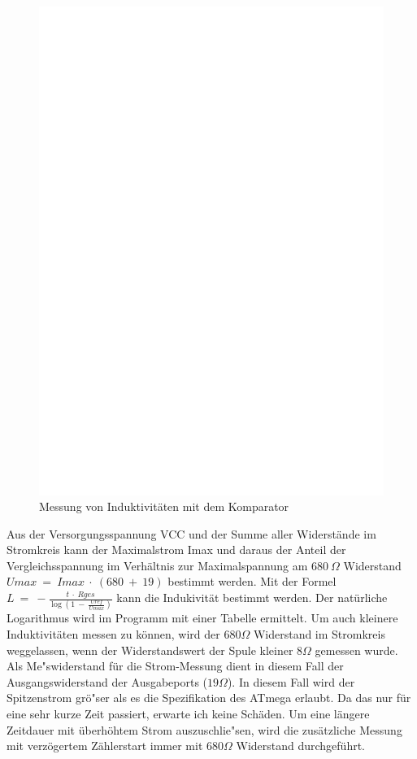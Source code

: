 \begin{figure}[H]
\centering
\includegraphics[]{../FIG/Inductance.eps}
\caption{Messung von Induktivit\"aten mit dem Komparator}
\label{fig:Inductance}
\end{figure}

Aus der Versorgungsspannung VCC und der Summe aller Widerst\"ande im Stromkreis kann der Maximalstrom Imax und
daraus der Anteil der Vergleichsspannung im Verh\"altnis zur Maximalspannung am \(680~\Omega\) Widerstand
\(Umax~=~Imax~\cdot~(680~+~19)\) bestimmt werden.
Mit der Formel \(L~=~-\frac{t~\cdot~Rges}{\log{(1~-~\frac{Uref}{Umax})}}\) kann die Indukivit\"at bestimmt werden.
Der nat\"urliche Logarithmus wird im Programm mit einer Tabelle ermittelt.
Um auch kleinere Induktivit\"aten messen zu k\"onnen, wird der \(680 \Omega\) Widerstand im Stromkreis weggelassen,
wenn der Widerstandswert der Spule kleiner \(8 \Omega\) gemessen wurde. Als Me"swiderstand f\"ur die Strom-Messung
dient in diesem Fall der Ausgangswiderstand der Ausgabeports (\(19 \Omega\)). In diesem Fall wird der Spitzenstrom gr\"o"ser
als es die Spezifikation des ATmega erlaubt. Da das nur f\"ur eine sehr kurze Zeit passiert, erwarte ich keine Sch\"aden.
Um eine l\"angere Zeitdauer mit \"uberh\"ohtem Strom auszuschlie"sen, wird die zus\"atzliche Messung mit 
verz\"ogertem Z\"ahlerstart immer mit \(680 \Omega\) Widerstand durchgef\"uhrt.


